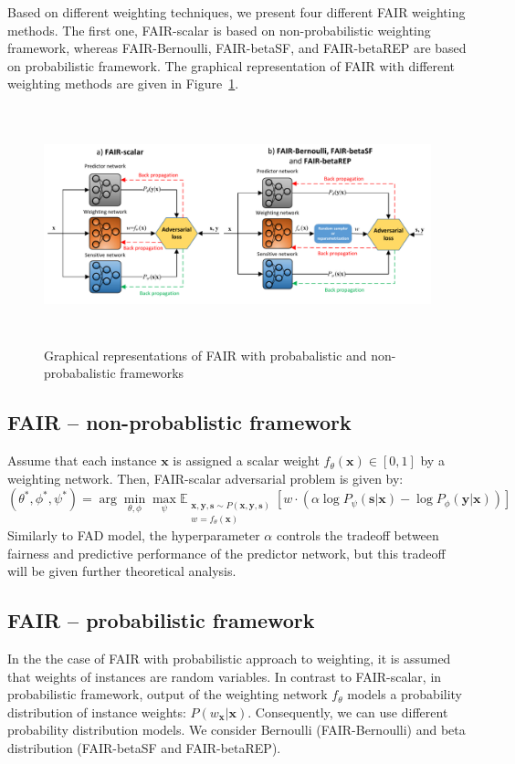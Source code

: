 \documentclass[preprint,12pt]{elsarticle}
\begin{document}
Based on different weighting techniques, we present four different FAIR weighting methods. The first one, FAIR-scalar is based on non-probabilistic weighting framework, whereas FAIR-Bernoulli, FAIR-betaSF, and FAIR-betaREP are based on probabilistic framework. The graphical representation of FAIR with different weighting methods are given in Figure~\ref{fig:Fig1}.

\begin{figure}[t!]
	\vskip 0.2in
	\center
	\includegraphics[angle=0, width=1\textwidth, height = 2.7in]{Fig1.pdf}
	\captionsetup{justification=centering}
	\caption{Graphical representations of FAIR with probabalistic and non-probabalistic frameworks}
	\label{fig:Fig1}
	\vskip -0.2in
\end{figure}

\subsection{FAIR -- non-probablistic framework}
Assume that each instance $\mathbf{x}$ is assigned a scalar weight $f_\theta(\mathbf{x})\in[0,1]$ by a weighting network. Then, FAIR-scalar adversarial problem is given by:
\begin{equation}
\label{Eq:Loss-scalar}
(\theta^*,\phi^*,\psi^*) = \arg\min_{\theta,\phi}\max_{\psi}\mathbb{E}_{\substack{\mathbf{x},\mathbf{y},\mathbf{s} \sim P(\mathbf{x},\mathbf{y},\mathbf{s})\\w=f_\theta(\mathbf{x})}} [w \cdot(\alpha\log P_{\psi}(\mathbf{s}|\mathbf{x})
- \log P_{\phi}(\mathbf{y}|\mathbf{x}))]
\end{equation}
Similarly to FAD model, the hyperparameter $\alpha$ controls the tradeoff between fairness and predictive performance of the predictor network, but this tradeoff will be given further theoretical analysis.


\subsection{FAIR -- probabilistic framework}
\label{Sec:FAD-pf}
In the the case of FAIR with probabilistic approach to weighting, it is assumed that  weights of instances are random variables. In contrast to FAIR-scalar, in probabilistic framework, output of the weighting network $f_\theta$ models a probability distribution of instance weights: $P(w_\mathbf{x}|\mathbf{x})$. Consequently, we can use different probability distribution models. We consider Bernoulli (FAIR-Bernoulli) and beta distribution (FAIR-betaSF and FAIR-betaREP).
\end{document}

